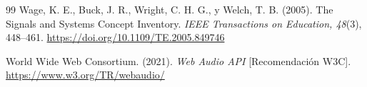 \documentclass[conference]{IEEEtran}
\begin{document}
\begin{thebibliography}{99}
Wage, K. E., Buck, J. R., Wright, C. H. G., y Welch, T. B. (2005). The Signals and Systems Concept Inventory. \emph{IEEE Transactions on Education, 48}(3), 448--461. \url{https://doi.org/10.1109/TE.2005.849746}

World Wide Web Consortium. (2021). \emph{Web Audio API} [Recomendación W3C]. \url{https://www.w3.org/TR/webaudio/}

\end{thebibliography}
\end{document}
